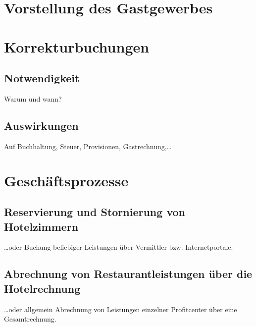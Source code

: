 \label{sec:grundlagen}

\section{Vorstellung des Gastgewerbes} %
\label{sec:vorstellung_des_gastgewerbes}


\section{Korrekturbuchungen} %
\label{sec:korrekturbuchungen}
\subsection{Notwendigkeit} %
\label{sub:notwendigkeit}
Warum und wann?
\subsection{Auswirkungen} %
\label{sub:auswirkungen}
Auf Buchhaltung, Steuer, Provisionen, Gastrechnung,…


\section{Geschäftsprozesse} %
\label{sec:geschaftsprozesse}
\subsection{Reservierung und Stornierung von Hotelzimmern} %
\label{sub:reservierung_und_stornierung_von_hotelzimmern}
…oder Buchung beliebiger Leistungen über Vermittler bzw. Internetportale.

\subsection{Abrechnung von Restaurantleistungen über die Hotelrechnung} %
\label{sub:abrechnung_von_restaurantleistungen_uber_die_hotelrechnung}
…oder allgemein Abrechnung von Leistungen einzelner Profitcenter über eine Gesamtrechnung.

